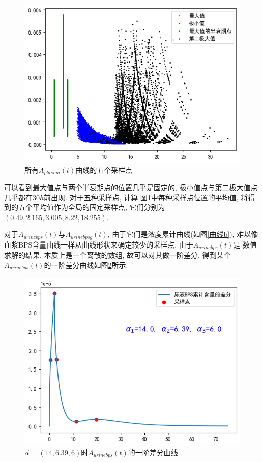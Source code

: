 \documentclass[a4paper,punct=banjiao,twoside]{ctexrep}
\theoremstyle{plain}
\theoremstyle{definition}
\theoremstyle{remark}
\begin{document}
\begin{figure}[H]
  \centering
  \includegraphics[scale=0.45]{./figs/p3_1.png}
  \caption{所有$A_{plasma}(t)$曲线的五个采样点}
  \label{血浆五点}
\end{figure}

\noindent 可以看到最大值点与两个半衰期点的位置几乎是固定的, 极小值点与第二极大值点几乎都在$30h$前出现. 对于五种采样点, 计算
图\ref{血浆五点}中每种采样点位置的平均值, 将得到的五个平均值作为全局的固定采样点, 它们分别为$(0.49,2.165, 3.005 ,8.22,18.255)$.

对于$A_{urinebps}(t)$与$A_{urinebpsg}(t)$, 由于它们是浓度累计曲线(如图\ref{曲线b}), 难以像血浆BPS含量曲线一样从曲线形状来确定较少的采样点. 由于$A_{urinebps}(t)$是
数值求解的结果, 本质上是一个离散的数组, 故可以对其做一阶差分, 得到某个$A_{urinebps}(t)$的一阶差分曲线如图\ref{尿液差分}所示:
\begin{figure}[H]
  \centering
  \includegraphics[scale=0.45]{./figs/p4_1.png}
  \caption{$\vec{\alpha}=(14,6.39,6)$时$A_{urinebps}(t)$的一阶差分曲线}
  \label{尿液差分}
\end{figure}
\end{document}
